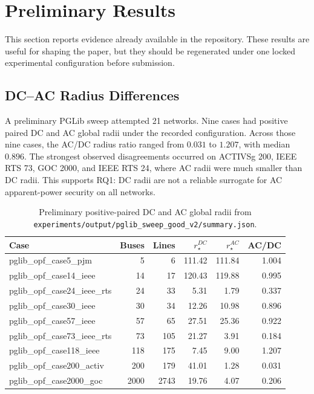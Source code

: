 \documentclass[11pt]{article}
\begin{document}
\section{Preliminary Results}
\label{sec:preliminary}

This section reports evidence already available in the repository. These results are useful for shaping the paper, but they should be regenerated under one locked experimental configuration before submission.

\subsection{DC--AC Radius Differences}

A preliminary PGLib sweep attempted 21 networks. Nine cases had positive paired DC and AC global radii under the recorded configuration. Across those nine cases, the AC/DC radius ratio ranged from $0.031$ to $1.207$, with median $0.896$. The strongest observed disagreements occurred on ACTIVSg 200, IEEE RTS 73, GOC 2000, and IEEE RTS 24, where AC radii were much smaller than DC radii. This supports RQ1: DC radii are not a reliable surrogate for AC apparent-power security on all networks.

\begin{table}[t]
\centering
\caption{Preliminary positive-paired DC and AC global radii from \texttt{experiments/output/pglib\_sweep\_good\_v2/summary.json}.}
\label{tab:dc-ac}
\begin{tabular}{lrrrrr}
\toprule
Case & Buses & Lines & $r_\star^{DC}$ & $r_\star^{AC}$ & AC/DC \\
\midrule
pglib\_opf\_case5\_pjm & 5 & 6 & 111.42 & 111.84 & 1.004 \\
pglib\_opf\_case14\_ieee & 14 & 17 & 120.43 & 119.88 & 0.995 \\
pglib\_opf\_case24\_ieee\_rts & 24 & 33 & 5.31 & 1.79 & 0.337 \\
pglib\_opf\_case30\_ieee & 30 & 34 & 12.26 & 10.98 & 0.896 \\
pglib\_opf\_case57\_ieee & 57 & 65 & 27.51 & 25.36 & 0.922 \\
pglib\_opf\_case73\_ieee\_rts & 73 & 105 & 21.27 & 3.91 & 0.184 \\
pglib\_opf\_case118\_ieee & 118 & 175 & 7.45 & 9.00 & 1.207 \\
pglib\_opf\_case200\_activ & 200 & 179 & 41.01 & 1.28 & 0.031 \\
pglib\_opf\_case2000\_goc & 2000 & 2743 & 19.76 & 4.07 & 0.206 \\
\bottomrule
\end{tabular}
\end{table}
\end{document}
